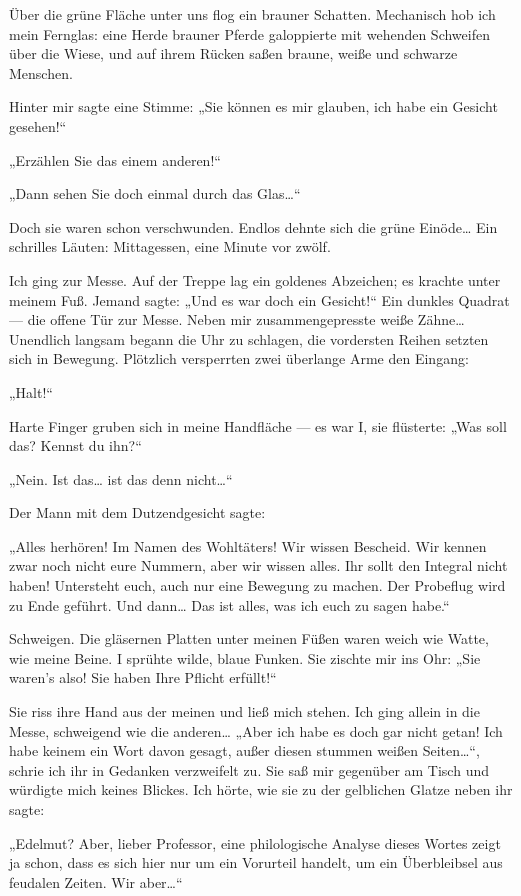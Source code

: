 Über die grüne Fläche unter uns flog ein brauner Schatten.
Mechanisch hob ich mein Fernglas: eine Herde brauner Pferde
galoppierte mit wehenden Schweifen über die Wiese, und auf ihrem
Rücken saßen braune, weiße und schwarze Menschen.

Hinter mir sagte eine Stimme: „Sie können es mir glauben, ich habe
ein Gesicht gesehen!“

„Erzählen Sie das einem anderen!“

„Dann sehen Sie doch einmal durch das Glas\ldots{}“

Doch sie waren schon
verschwunden. Endlos dehnte sich die grüne Einöde\ldots{} Ein schrilles
Läuten: Mittagessen, eine Minute vor zwölf.

Ich ging zur Messe. Auf der Treppe lag ein goldenes Abzeichen; es
krachte unter meinem Fuß. Jemand sagte: „Und es war doch ein
Gesicht!“ Ein dunkles Quadrat — die offene Tür zur Messe. Neben mir
zusammengepresste weiße Zähne\ldots{} Unendlich langsam begann die Uhr
zu schlagen, die vordersten Reihen setzten sich in Bewegung.
Plötzlich versperrten zwei überlange Arme den Eingang:

„Halt!“

Harte Finger gruben sich in meine Handfläche — es war I, sie
flüsterte: „Was soll das? Kennst du ihn?“

„Nein. Ist das\ldots{} ist das denn nicht\ldots{}“

Der Mann mit dem Dutzendgesicht sagte:

„Alles
herhören! Im Namen des Wohltäters! Wir wissen Bescheid. Wir kennen
zwar noch nicht eure Nummern, aber wir wissen alles. Ihr sollt den
Integral nicht haben! Untersteht euch, auch nur eine Bewegung zu
machen. Der Probeflug wird zu Ende geführt. Und dann\ldots{} Das ist
alles, was ich euch zu sagen habe.“

Schweigen. Die gläsernen Platten unter meinen Füßen waren weich wie
Watte, wie meine Beine. I sprühte wilde, blaue Funken. Sie zischte
mir ins Ohr: „Sie waren's also! Sie haben Ihre
\glq{}Pflicht\grq{} erfüllt!“

Sie riss ihre Hand aus
der meinen und ließ mich stehen. Ich ging allein in die Messe,
schweigend wie die anderen\ldots{} „Aber ich habe es doch gar nicht
getan! Ich habe keinem ein Wort davon gesagt, außer diesen stummen
weißen Seiten\ldots{}“, schrie ich ihr in Gedanken verzweifelt zu. Sie
saß mir gegenüber am Tisch und würdigte mich keines Blickes. Ich
hörte, wie sie zu der gelblichen Glatze neben ihr sagte:

„Edelmut? Aber, lieber Professor, eine philologische Analyse dieses
Wortes zeigt ja schon, dass es sich hier nur um ein Vorurteil
handelt, um ein Überbleibsel aus feudalen Zeiten. Wir aber\ldots{}“

